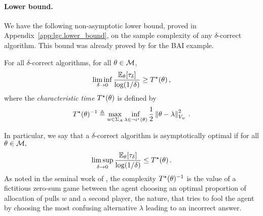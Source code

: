 \paragraph{Lower bound.}
We have the following non-asymptotic lower bound, proved in Appendix~\ref{app:lgc.lower_bound}, on the sample complexity of any $\delta$-correct algorithm. This bound was already proved by \citet{soare2014linear} for the BAI example.
\begin{theorem}
\label{th:lb_genral}
For all $\delta$-correct algorithms, for all $\theta\in \mathcal{M}$,
\begin{equation*}
  \label{eq:lb_general}
  \liminf_{\delta\to 0}\frac{\mathbb{E}_\theta[\tau_{\delta}]}{\log(1/\delta)} \geq T^{\star}(\theta) \,,
\end{equation*}
where the \emph{characteristic time} $T^{\star}(\theta)$ is defined by
\[
T^{\star}(\theta)^{-1} \triangleq \max_{w \in \Sigma_A} \inf_{\lambda\in \neg i^\star(\theta)} \frac{1}{2}\left\lVert\theta - \lambda\right\rVert_{V_w}^2\,.
\]
\end{theorem}
In particular, we say that a $\delta$-correct algorithm is asymptotically optimal if for all $\theta\in\mathcal{M},$
\[
\limsup_{\delta\to 0}\frac{\mathbb{E}_\theta[\tau_{\delta}]}{\log(1/\delta)} \leq T^{\star}(\theta)\,.
\]
As noted in the seminal work of \citet{chernoff1959}, the complexity $T^{\star}(\theta)^{-1}$ is the value of a fictitious zero-sum game between the agent choosing an optimal proportion of allocation of pulls $w$ and a second player, the nature, that tries to fool the agent by choosing the most confusing alternative $\lambda$ leading to an incorrect answer.

